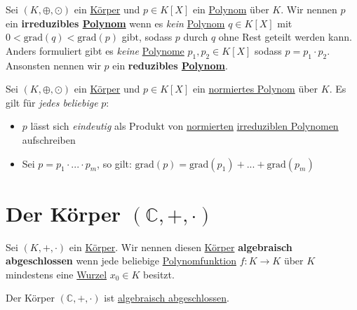 \documentclass[../../main.tex]{subfiles}
\begin{document}
		\begin{definition}
			\label{def:reduziblesPolynom}
			\label{def:irreduziblesPolynom}
			Sei $(K,\oplus, \odot)$ ein \hyperref[def:Körper]{Körper} und $p \in K[X]$ ein \hyperref[def:Polynom]{Polynom} über $K$. Wir nennen $p$ ein \textbf{irreduzibles \hyperref[def:Polynom]{Polynom}} wenn es \textit{kein} \hyperref[def:Polynom]{Polynom} $q \in K[X]$ mit $0 < \textrm{grad}(q) < \textrm{grad}(p)$ gibt, sodass $p$ durch $q$ ohne Rest geteilt werden kann. Anders formuliert gibt es \textit{keine} \hyperref[def:Polynom]{Polynome} $p_1,p_2 \in K[X]$ sodass $p = p_1 \cdot p_2$. Ansonsten nennen wir $p$ ein \textbf{reduzibles \hyperref[def:Polynom]{Polynom}}.
		\end{definition}
	
		\begin{theorem}
			Sei $(K,\oplus, \odot)$ ein \hyperref[def:Körper]{Körper} und $p \in K[X]$ ein \hyperref[def:normiertesPolynom]{normiertes Polynom} über $K$. Es gilt für \textit{jedes beliebige} $p$:
			\begin{itemize}
				\item $p$ lässt sich \textit{eindeutig} als Produkt von \hyperref[def:normiertesPolynom]{normierten} \hyperref[def:irreduziblesPolynom]{irreduziblen Polynomen} aufschreiben
				\item Sei $p = p_1 \cdot ... \cdot p_m$, so gilt: $\textrm{grad}(p) = \textrm{grad}(p_1) + ... + \textrm{grad}(p_m)$
			\end{itemize}
		\end{theorem}
	
	
		\section{Der Körper $(\mathbb{C},+,\cdot)$}
		
		\begin{definition}
			\label{def:algebraischAbgeschlossen}
			Sei $(K, +, \cdot)$ ein \hyperref[def:Körper]{Körper}. Wir nennen diesen \hyperref[def:Körper]{Körper} \textbf{algebraisch abgeschlossen} wenn jede beliebige \hyperref[def:Polynomfunktion]{Polynomfunktion} $f: K \rightarrow K$ über $K$ mindestens eine \hyperref[def:Wurzel]{Wurzel} $x_0 \in K$ besitzt. 
		\end{definition}
	
		\begin{theorem}
			\label{satz:FundamentalsatzDerAlgebra}
			Der Körper $(\mathbb{C},+,\cdot)$ ist \hyperref[def:algebraischAbgeschlossen]{algebraisch abgeschlossen}. 
		\end{theorem}
	
\end{document}
